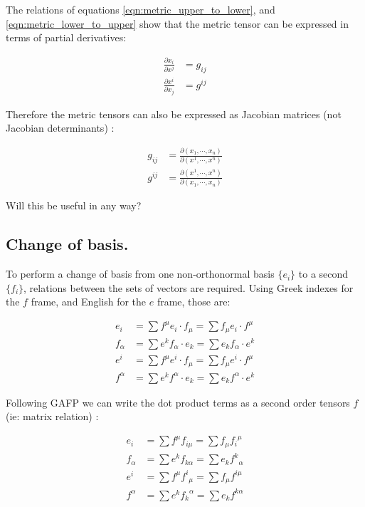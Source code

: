\documentclass{article}      %
\begin{document}
The relations of equations \ref{eqn:metric_upper_to_lower}, and \ref{eqn:metric_lower_to_upper} show that the metric tensor can be expressed in terms of partial derivatives:

\begin{align}
\frac{\partial x_i }{\partial x^j } &= g_{ij} \\
\frac{\partial x^i }{\partial x_j } &= g^{ij}
\end{align}

Therefore the metric tensors can also be expressed as Jacobian matrices (not Jacobian determinants) :

\begin{align}
g_{ij} &= \frac{\partial (x_1, \cdots, x_n) }{\partial (x^1, \cdots, x^n) } \\
g^{ij} &= \frac{\partial (x^1, \cdots, x^n) }{\partial (x_1, \cdots, x_n) }
\end{align}

Will this be useful in any way?

\subsection{ Change of basis. }

To perform a change of basis from one non-orthonormal basis $\{e_i\}$ to a second $\{f_i\}$, relations between the sets of vectors
are required.  Using Greek indexes for the $f$ frame, and English for the $e$ frame, those are:

\begin{align*}
e_i 		&= \sum f^{\mu} e_i \cdot f_{\mu} 	= \sum f_{\mu} e_i \cdot f^{\mu} \\
f_{\alpha} 	&= \sum e^k f_{\alpha} \cdot e_k 	= \sum e_k f_{\alpha} \cdot e^k \\
e^i 		&= \sum f^{\mu} e^i \cdot f_{\mu} 	= \sum f_{\mu} e^i \cdot f^{\mu} \\
f^{\alpha} 	&= \sum e^k f^{\alpha} \cdot e_k 	= \sum e_k f^{\alpha} \cdot e^k 
\end{align*}

Following GAFP we can write the dot product terms as a second order tensors $f$ (ie: matrix relation) :

\begin{align*}
e_i 		&= \sum f^{\mu} f_{i\mu}  	= \sum f_{\mu} {f_i}^{\mu} \\
f_{\alpha} 	&= \sum e^k f_{k\alpha} 	= \sum e_k {f^k}_{\alpha} \\
e^i 		&= \sum f^{\mu} {f^i}_{\mu} 	= \sum f_{\mu} f^{i \mu} \\
f^{\alpha} 	&= \sum e^k {f_k}^{\alpha}  	= \sum e_k f^{k\alpha}
\end{align*}
\end{document}
